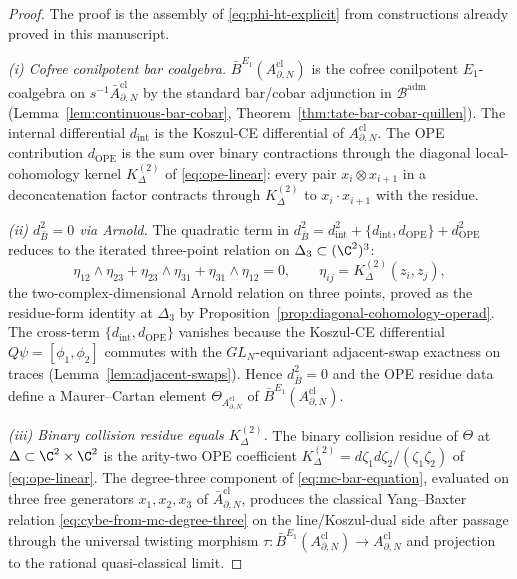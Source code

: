 \begin{proof}
The proof is the assembly of \eqref{eq:phi-ht-explicit} from
constructions already proved in this manuscript.

\emph{(i) Cofree conilpotent bar coalgebra.}
\(\bar B^{E_1}(A^{\mathrm{cl}}_{\partial,N})\) is the cofree
conilpotent \(E_1\)-coalgebra on
\(s^{-1}\bar A^{\mathrm{cl}}_{\partial,N}\) by the standard
bar/cobar adjunction in \(\mathcal B^{\mathrm{adm}}\)
(Lemma~\ref{lem:continuous-bar-cobar},
Theorem~\ref{thm:tate-bar-cobar-quillen}).  The internal differential
\(d_{\mathrm{int}}\) is the Koszul-CE differential of
\(A^{\mathrm{cl}}_{\partial,N}\).  The OPE contribution
\(d_{\mathrm{OPE}}\) is the sum over binary contractions through the
diagonal local-cohomology kernel \(K^{(2)}_\Delta\) of
\eqref{eq:ope-linear}: every pair \(x_i\otimes x_{i+1}\) in a
deconcatenation factor contracts through \(K^{(2)}_\Delta\) to
\(x_i\cdot x_{i+1}\) with the residue.

\emph{(ii) \(d_{\bar B}^2=0\) via Arnold.}
The quadratic term in \(d_{\bar B}^2=
d_{\mathrm{int}}^2+\{d_{\mathrm{int}},d_{\mathrm{OPE}}\}
+d_{\mathrm{OPE}}^2\) reduces to the iterated three-point relation on
\(\Delta_3\subset(\C^2)^3\):
\[
  \eta_{12}\wedge\eta_{23}+\eta_{23}\wedge\eta_{31}
   +\eta_{31}\wedge\eta_{12}=0,\qquad
  \eta_{ij}=K^{(2)}_\Delta(z_i,z_j),
\]
the two-complex-dimensional Arnold relation on three points, proved as
the residue-form identity at \(\Delta_3\) by
Proposition~\ref{prop:diagonal-cohomology-operad}.  The cross-term
\(\{d_{\mathrm{int}},d_{\mathrm{OPE}}\}\) vanishes because the
Koszul-CE differential \(Q\psi=[\phi_1,\phi_2]\) commutes with the
\(GL_N\)-equivariant adjacent-swap exactness on traces
(Lemma~\ref{lem:adjacent-swaps}).  Hence \(d_{\bar B}^2=0\) and the
OPE residue data define a Maurer--Cartan element
\(\Theta_{A^{\mathrm{cl}}_{\partial,N}}\) of
\(\bar B^{E_1}(A^{\mathrm{cl}}_{\partial,N})\).

\emph{(iii) Binary collision residue equals \(K^{(2)}_\Delta\).}
The binary collision residue of \(\Theta\) at \(\Delta\subset
\C^2\times\C^2\) is the arity-two OPE coefficient
\(K^{(2)}_\Delta=d\zeta_1d\zeta_2/(\zeta_1\zeta_2)\) of
\eqref{eq:ope-linear}.  The degree-three component of
\eqref{eq:mc-bar-equation}, evaluated on three free generators
\(x_1,x_2,x_3\) of \(\bar A^{\mathrm{cl}}_{\partial,N}\), produces the
classical Yang--Baxter relation \eqref{eq:cybe-from-mc-degree-three}
on the line/Koszul-dual side after passage through the universal
twisting morphism \(\tau\colon\bar B^{E_1}(A^{\mathrm{cl}}_{\partial,N})
\to A^{\mathrm{cl}}_{\partial,N}\) and projection to the rational
quasi-classical limit.


\end{proof}
